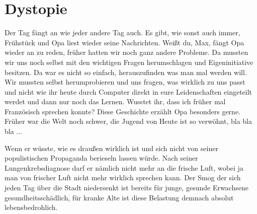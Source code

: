 \documentclass[twoside, a4paper, DIV=11, open=any, bibliography=totoc]{scrbook}
\newcommand{\Quote}[1]{\glqq #1\grqq{}}
\begin{document}
\section*{Dystopie} \label{sec:szendystopie}

Der Tag fängt an wie jeder andere Tag auch. Es gibt, wie sonst auch immer,
Frühstück und Opa liest wieder
seine Nachrichten. \Quote{Weißt du, Max}, fängt Opa wieder an zu reden, 
\Quote{früher hatten
wir noch ganz andere
Probleme. Da mussten wir uns noch selbst mit den wichtigen Fragen herumschlagen und
Eigeninitiative besitzen.
Da war es nicht so einfach, herauszufinden was man mal werden will. Wir mussten
selbst herumprobieren und
uns fragen, was wirklich zu uns passt und nicht wie ihr heute durch Computer direkt
in eure Leidenschaften
eingeteilt werdet und dann nur noch das Lernen. Wusstet ihr, dass ich früher mal
Französisch sprechen konnte?}
Diese Geschichte erzählt Opa besonders gerne.
\Quote{Früher war die Welt noch schwer, die
Jugend von Heute ist so
verwöhnt, bla bla bla ...}

Wenn er wüsste, wie es draußen wirklich ist und sich nicht von seiner
populistischen Propaganda berieseln lassen würde.
Nach seiner Lungenkrebsdiagnose darf er nämlich nicht mehr an die frische Luft,
wobei ja man von frischer Luft nicht mehr wirklich sprechen kann.
Der Smog der sich jeden Tag über die Stadt niedersenkt ist bereits für
junge, gesunde Erwachsene gesundheitsschädlich, für kranke Alte ist diese
Belastung demnach absolut lebensbedrohlich.
\end{document}
